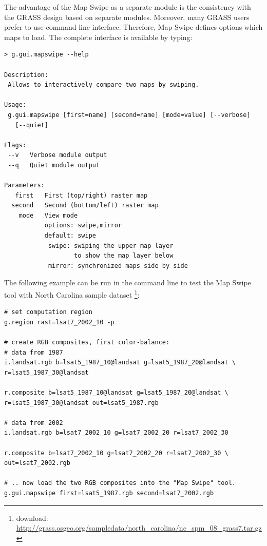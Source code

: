 \documentclass[a4paper,12pt,oneside]{book}
\newcommand{\ms}{Map Swipe\xspace}
\begin{document}
The advantage of the \ms as a separate module is the consistency with the GRASS design based on
separate modules. Moreover, many GRASS users prefer to use command line interface.
Therefore, \ms defines options which maps to load.
The complete interface is available by typing:

\begin{small}
\begin{lstlisting}[style=mybash]
> g.gui.mapswipe --help

Description:
 Allows to interactively compare two maps by swiping.

Usage:
 g.gui.mapswipe [first=name] [second=name] [mode=value] [--verbose]
   [--quiet]

Flags:
 --v   Verbose module output
 --q   Quiet module output

Parameters:
   first   First (top/right) raster map
  second   Second (bottom/left) raster map
    mode   View mode
           options: swipe,mirror
           default: swipe
            swipe: swiping the upper map layer
                   to show the map layer below
            mirror: synchronized maps side by side

\end{lstlisting}
\end{small}

The following example \cite{mapswipeWiki} can be run in the command line to test
the \ms tool with North Carolina sample dataset%
\footnote{download: \url{http://grass.osgeo.org/sampledata/north_carolina/nc_spm_08_grass7.tar.gz}}:
\begin{small}
\begin{lstlisting}[style=mybash]
# set computation region
g.region rast=lsat7_2002_10 -p

# create RGB composites, first color-balance:
# data from 1987
i.landsat.rgb b=lsat5_1987_10@landsat g=lsat5_1987_20@landsat \
r=lsat5_1987_30@landsat

r.composite b=lsat5_1987_10@landsat g=lsat5_1987_20@landsat \
r=lsat5_1987_30@landsat out=lsat5_1987.rgb

# data from 2002
i.landsat.rgb b=lsat7_2002_10 g=lsat7_2002_20 r=lsat7_2002_30

r.composite b=lsat7_2002_10 g=lsat7_2002_20 r=lsat7_2002_30 \
out=lsat7_2002.rgb

# .. now load the two RGB composites into the "Map Swipe" tool.
g.gui.mapswipe first=lsat5_1987.rgb second=lsat7_2002.rgb
\end{lstlisting}
\end{small}
\end{document}
